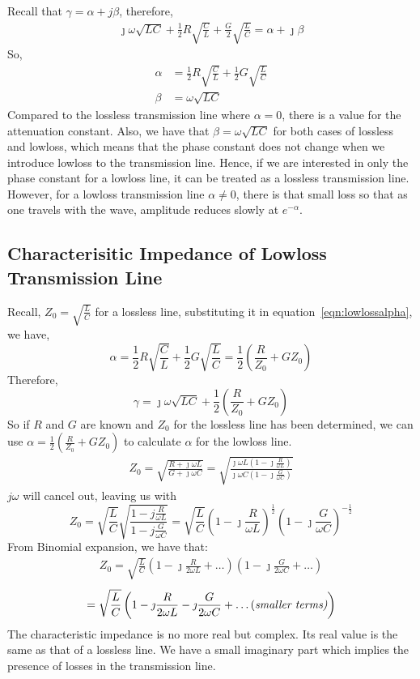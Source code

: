 Recall that $\gamma = \alpha + j\beta$, therefore,
\begin{align*}
\jmath\omega\sqrt{LC} + \frac{1}{2}R\sqrt{\frac{C}{L}} + \frac{G}{2}\sqrt{\frac{L}{C}} = \alpha + \jmath\beta
\end{align*}
So,
\begin{align}
\alpha &= \frac{1}{2}R\sqrt{\frac{C}{L}} + \frac{1}{2}G\sqrt{\frac{L}{C}}\label{eqn:lowlossalpha}\\
\beta &= \omega\sqrt{LC}
\end{align}
Compared to the lossless transmission line where $\alpha = 0$, there is a value for the attenuation constant. Also, we have that $\beta = \omega\sqrt{LC}$ for both cases of lossless and lowloss, which means that the phase constant does not change when we introduce lowloss to the transmission line. Hence, if we are interested in only the phase constant for a lowloss line, it can be treated as a lossless transmission line. However, for a lowloss transmission line $\alpha \neq 0$, there is that small loss so that as one travels with the wave, amplitude reduces slowly at $e^{-\alpha}$.

\subsection{Characterisitic Impedance of Lowloss Transmission Line}
Recall, $Z_0 = \sqrt{\frac{L}{C}}$ for a lossless line, substituting it in equation~\eqref{eqn:lowlossalpha}, we have,
\[\alpha = \frac{1}{2}R\sqrt{\frac{C}{L}} + \frac{1}{2}G\sqrt{\frac{L}{C}} = \frac{1}{2}\left(\frac{R}{Z_0} + GZ_0\right)\]
Therefore,
\[\gamma = \jmath\omega\sqrt{LC} + \frac{1}{2}\left(\frac{R}{Z_0} + GZ_0\right)\]
So if $R$ and $G$ are known and $Z_0$ for the lossless line has been determined, we can use $\alpha = \frac{1}{2}(\frac{R}{Z_0} + GZ_0)$ to calculate $\alpha$ for the lowloss line.
\begin{align*}
Z_0 = \sqrt{\frac{R + \jmath\omega L}{G + \jmath\omega C}} = \sqrt{\frac{\jmath\omega L(1 - \jmath\frac{R}{\omega L})}{\jmath\omega C(1 - \jmath\frac{G}{\omega C})}}
\end{align*}
$j\omega$ will cancel out, leaving us with
\begin{dmath*}
Z_0 = \sqrt{\frac{L}{C}}\sqrt{\frac{1 - j\frac{R}{\omega L}}{1 - j\frac{G}{\omega C}}} =\sqrt{\frac{L}{C}}\left(1 - \jmath\frac{R}{\omega L}\right)^{\frac{1}{2}}\left(1 - \jmath\frac{G}{\omega C}\right)^{-\frac{1}{2}} 
\end{dmath*}
From Binomial expansion, we have that:
\begin{align*}
Z_0 = \sqrt{\frac{L}{C}}\left(1 - \jmath\frac{R}{2\omega L} + \ldots\right)\left(1 - \jmath\frac{G}{2\omega C} + \ldots\right)
\end{align*}
\begin{align*}
= \sqrt{\frac{L}{C}}\left(1 - \jmath\frac{R}{2\omega L} - \jmath\frac{G}{2\omega C} + \text{\ldots (\it{smaller terms})}\right)
\end{align*}
The characteristic impedance is no more real but complex. Its real value is the same as that of a lossless line. We have a small imaginary part which implies the presence of losses in the transmission line.


